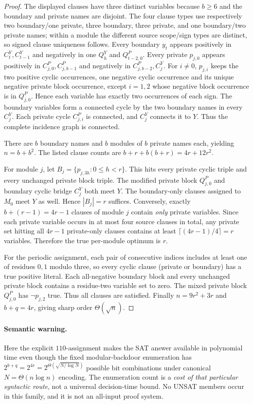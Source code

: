 \documentclass[11pt]{article}
\begin{document}
\begin{proof}
The displayed clauses have three distinct variables because $b\ge6$ and the boundary and private names are disjoint. The four clause types use respectively two boundary/one private, three boundary, three private, and one boundary/two private names; within a module the different source scope/sign types are distinct, so signed clause uniqueness follows. Every boundary $y_t$ appears positively in $C_t^Y,C_{t-1}^Y$ and negatively in one $Q_h^Y$ and $Q_{t-2,0}^P$. Every private $p_{j,0}$ appears positively in $C_{j,0}^P,C_{j,b-1}^P$ and negatively in $C_{j,b-2}^P,C_j^Y$. For $i\ne0$, $p_{j,i}$ keeps the two positive cyclic occurrences, one negative cyclic occurrence and its unique negative private block occurrence, except $i=1,2$ whose negative block occurrence is in $Q_{j,0}^P$. Hence each variable has exactly two occurrences of each sign. The boundary variables form a connected cycle by the two boundary names in every $C_j^Y$. Each private cycle $C_{j,i}^P$ is connected, and $C_j^Y$ connects it to $Y$. Thus the complete incidence graph is connected.

There are $b$ boundary names and $b$ modules of $b$ private names each, yielding $n=b+b^2$. The listed clause counts are $b+r+b(b+r)=4r+12r^2$.

For module $j$, let $B_j=\{p_{j,3h}:0\le h<r\}$. This hits every private cyclic triple and every unchanged private block triple. The modified private block $Q_{j,0}^P$ and boundary cyclic bridge $C_j^Y$ both meet $Y$. The boundary-only clauses assigned to $M_0$ meet $Y$ as well. Hence $|B_j|=r$ suffices. Conversely, exactly $b+(r-1)=4r-1$ clauses of module $j$ contain \emph{only} private variables. Since each private variable occurs in at most four source clauses in total, any private set hitting all $4r-1$ private-only clauses contains at least $\lceil(4r-1)/4\rceil=r$ variables. Therefore the true per-module optimum is $r$.

For the periodic assignment, each pair of consecutive indices includes at least one of residues $0,1$ modulo three, so every cyclic clause (private or boundary) has a true positive literal. Each all-negative boundary block and every unchanged private block contains a residue-two variable set to zero. The mixed private block $Q_{j,0}^P$ has $\neg p_{j,2}$ true. Thus all clauses are satisfied. Finally $n=9r^2+3r$ and $b+q=4r$, giving sharp order $\Theta(\sqrt n)$.\end{proof}

\paragraph{Semantic warning.} Here the explicit $110$-assignment makes the SAT answer available in polynomial time even though the fixed modular-backdoor enumeration has $2^{b+q}=2^{4r}=2^{\Theta(\sqrt{N/\log N})}$ possible bit combinations under canonical $N=\Theta(n\log n)$ encoding. The enumeration count is a \emph{cost of that particular syntactic route}, not a universal decision-time bound. No UNSAT members occur in this family, and it is not an all-input proof system.
\end{document}
